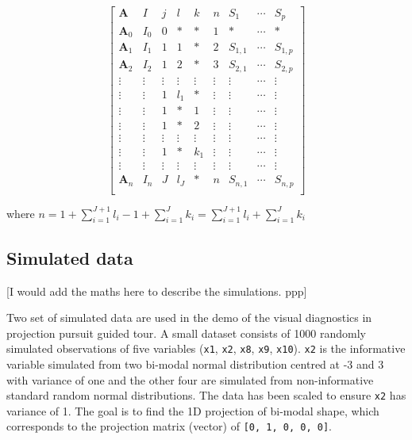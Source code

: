 \documentclass[12pt]{article}
\begin{document}
\begin{equation}
\left[
\begin{array}{c|c|cccc|ccc}
\mathbf{A} & I & j &  l  & k & n & S_{1}& \cdots & S_{p}\\
\hline
\mathbf{A}_0 & I_0 & 0 & \ast & \ast & 1 & \ast & \cdots & \ast\\
\hline
\mathbf{A}_1 & I_1 & 1 & 1 & \ast& 2 & S_{1, 1} & \cdots & S_{1, p}\\
\mathbf{A}_2 & I_2 & 1 & 2 &\ast & 3 & S_{2, 1} & \cdots & S_{2, p}\\
\vdots &\vdots & \vdots &\vdots & \vdots &\vdots &\vdots &\cdots &\vdots\\
\vdots & \vdots & 1 & l_1 & \ast & \vdots & \vdots & \cdots & \vdots\\
\hline
\vdots & \vdots & 1 & \ast & 1& \vdots &\vdots & \cdots & \vdots\\
\vdots &\vdots& 1 & \ast & 2& \vdots&\vdots & \cdots & \vdots\\
\vdots &\vdots &\vdots  &\vdots & \vdots &\vdots &\vdots &\cdots &\vdots \\
\vdots &\vdots & 1 & \ast & k_1&\vdots &\vdots & \cdots & \vdots\\
\hline
\vdots &\vdots &\vdots  &\vdots & \vdots &\vdots &\vdots &\cdots &\vdots \\
\mathbf{A}_n & I_n & J &  l_J & \ast & n & S_{n, 1}& \cdots & S_{n, p}\\
\end{array}
\right]
\label{eq:data-structure}
\end{equation}

where
\(n = 1 + \sum_{i = 1}^{J+1} l_i -1 + \sum_{i = 1}^{J} k_i= \sum_{i = 1}^{J+1} l_i + \sum_{i = 1}^{J} k_i\)

\hypertarget{simulated-data}{%
\subsection{Simulated data}\label{simulated-data}}

{[}I would add the maths here to describe the simulations. ppp{]}

Two set of simulated data are used in the demo of the visual diagnostics
in projection pursuit guided tour. A small dataset consists of 1000
randomly simulated observations of five variables (\texttt{x1},
\texttt{x2}, \texttt{x8}, \texttt{x9}, \texttt{x10}). \texttt{x2} is the
informative variable simulated from two bi-modal normal distribution
centred at -3 and 3 with variance of one and the other four are
simulated from non-informative standard random normal distributions. The
data has been scaled to ensure \texttt{x2} has variance of 1. The goal
is to find the 1D projection of bi-modal shape, which corresponds to the
projection matrix (vector) of \texttt{{[}0,\ 1,\ 0,\ 0,\ 0{]}}.
\end{document}
